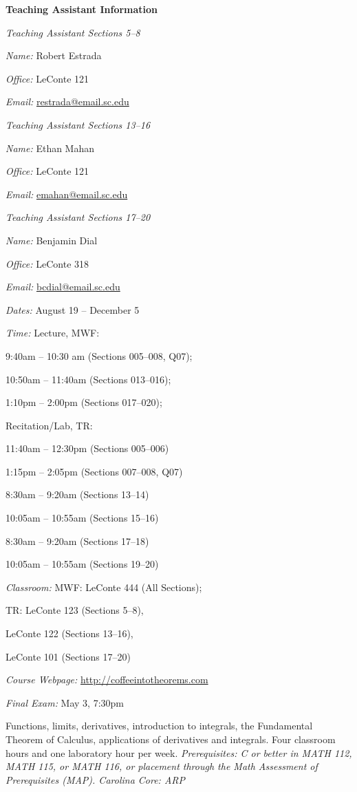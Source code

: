 \documentclass[11pt,letterpaper]{article}
\newcommand{\classdates}{August 19 -- December 5}
\newcommand{\classtimes}{
Lecture, MWF: \par \hspace{1.5cm} 9:40am -- 10:30 am (Sections 005--008, Q07); \par \hspace{1.5cm} 
10:50am -- 11:40am (Sections 013--016); \par \hspace{1.5cm} 
1:10pm -- 2:00pm (Sections 017--020); \par \hspace{0.95cm} 
Recitation/Lab, TR: \par \hspace{1.5cm} 
11:40am -- 12:30pm (Sections 005--006) \par \hspace{1.5cm} 
1:15pm -- 2:05pm (Sections 007--008, Q07) \par \hspace{1.5cm} 
8:30am -- 9:20am (Sections 13--14) \par \hspace{1.5cm} 
10:05am -- 10:55am (Sections 15--16) \par \hspace{1.5cm} 
8:30am -- 9:20am (Sections 17--18) \par \hspace{1.5cm} 
10:05am -- 10:55am (Sections 19--20)}
\newcommand{\classroom}{MWF: LeConte 444 (All Sections); \par \hspace{1.8cm} 
TR: LeConte 123 (Sections 5--8), \par \hspace{2.5cm} 
LeConte 122 (Sections 13--16), \par \hspace{2.5cm} 
LeConte 101 (Sections 17--20)}
\newcommand{\website}{http://coffeeintotheorems.com}
\begin{document}
{\bfseries\color{scred} Teaching Assistant Information} \par \vspace{0.1cm}
\hspace{0.25cm} \begin{minipage}[b]{0.32\textwidth}
        {\itshape Teaching Assistant Sections 5--8} \par
        \textit{Name:} Robert Estrada \par
        \textit{Office:} LeConte 121 \par
        \textit{Email:} \href{mailto:restrada@email.sc.edu}{restrada@email.sc.edu}
\end{minipage}\begin{minipage}[b]{0.35\textwidth}
        {\itshape Teaching Assistant Sections 13--16} \par
        \textit{Name:} Ethan Mahan \par
        \textit{Office:}  LeConte 121 \par
        \textit{Email:} \href{mailto:emahan@email.sc.edu}{emahan@email.sc.edu}
\end{minipage}\begin{minipage}[b]{0.33\textwidth}
        {\itshape Teaching Assistant Sections 17--20} \par
        \textit{Name:} Benjamin Dial \par
        \textit{Office:}  LeConte 318 \par
        \textit{Email:} \href{mailto:bcdial@email.sc.edu}{bcdial@email.sc.edu}
\end{minipage}
\pspace



\textit{Dates:} \classdates \par
\textit{Time:} \classtimes \par
\textit{Classroom:} \classroom \par
\textit{Course Webpage:} \href{\website}{\website} \par
\textit{Final Exam:} May 3, 7:30pm
\sectionbreak




Functions, limits, derivatives, introduction to integrals, the Fundamental Theorem of Calculus, applications of derivatives and integrals. Four classroom hours and one laboratory hour per week. {\itshape Prerequisites: C or better in MATH 112, MATH 115, or MATH 116, or placement through the Math Assessment of Prerequisites (MAP). Carolina Core: ARP}
\sectionbreak
\end{document}
